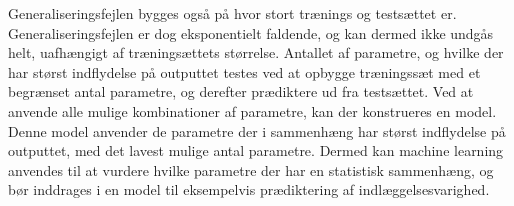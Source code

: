 \noindent
Generaliseringsfejlen bygges også på hvor stort trænings og testsættet er. Generaliseringsfejlen er dog eksponentielt faldende, og kan dermed ikke undgås helt, uafhængigt af træningsættets størrelse.\cite{DIKU2010}
Antallet af parametre, og hvilke der har størst indflydelse på outputtet testes ved at opbygge træningssæt med et begrænset antal parametre, og derefter prædiktere ud fra testsættet. Ved at anvende alle mulige kombinationer af parametre, kan der konstrueres en model. Denne model anvender de parametre der i sammenhæng har størst indflydelse på outputtet, med det lavest mulige antal parametre. Dermed kan machine learning anvendes til at vurdere hvilke parametre der har en statistisk sammenhæng, og bør inddrages i en model til eksempelvis prædiktering af indlæggelsesvarighed.\cite{Kuhn2013,DIKU2010} 